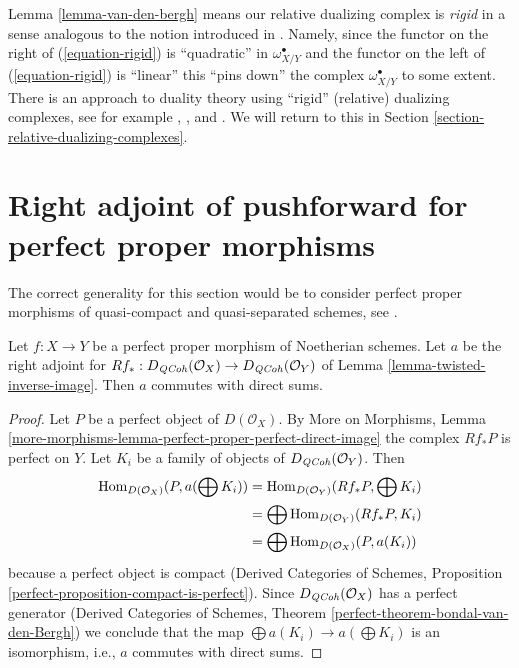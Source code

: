 \begin{remark}
\label{remark-van-den-bergh}
Lemma \ref{lemma-van-den-bergh} means our relative dualizing
complex is {\it rigid} in a sense analogous to the notion introduced
in \cite{vdB-rigid}. Namely, since the functor on the right of
(\ref{equation-rigid})
is ``quadratic'' in $\omega_{X/Y}^\bullet$ and the functor on the left
of (\ref{equation-rigid})
is ``linear'' this ``pins down'' the complex $\omega_{X/Y}^\bullet$
to some extent. There is an approach to duality theory using
``rigid'' (relative) dualizing complexes, see for example
\cite{Neeman-rigid}, \cite{Yekutieli-rigid}, and \cite{Yekutieli-Zhang}.
We will return to this in Section \ref{section-relative-dualizing-complexes}.
\end{remark}





\section{Right adjoint of pushforward for perfect proper morphisms}
\label{section-perfect-proper}

\noindent
The correct generality for this section would be to consider
perfect proper morphisms of quasi-compact and quasi-separated
schemes, see \cite{LN}.

\begin{lemma}
\label{lemma-proper-flat-noetherian}
Let $f : X \to Y$ be a perfect proper morphism of Noetherian schemes.
Let $a$ be the right adjoint for
$Rf_* : D_{\mathit{QCoh}}(\mathcal{O}_X) \to D_{\mathit{QCoh}}(\mathcal{O}_Y)$ of
Lemma \ref{lemma-twisted-inverse-image}. Then $a$ commutes with direct sums.
\end{lemma}

\begin{proof}
Let $P$ be a perfect object of $D(\mathcal{O}_X)$. By
More on Morphisms, Lemma
\ref{more-morphisms-lemma-perfect-proper-perfect-direct-image}
the complex $Rf_*P$ is perfect on $Y$.
Let $K_i$ be a family of objects of $D_{\mathit{QCoh}}(\mathcal{O}_Y)$.
Then
\begin{align*}
\mathop{\mathrm{Hom}}\nolimits_{D(\mathcal{O}_X)}(P, a(\bigoplus K_i))
& =
\mathop{\mathrm{Hom}}\nolimits_{D(\mathcal{O}_Y)}(Rf_*P, \bigoplus K_i) \\
& =
\bigoplus \mathop{\mathrm{Hom}}\nolimits_{D(\mathcal{O}_Y)}(Rf_*P, K_i) \\
& =
\bigoplus \mathop{\mathrm{Hom}}\nolimits_{D(\mathcal{O}_X)}(P, a(K_i))
\end{align*}
because a perfect object is compact (Derived Categories of Schemes,
Proposition \ref{perfect-proposition-compact-is-perfect}).
Since $D_{\mathit{QCoh}}(\mathcal{O}_X)$ has a perfect generator
(Derived Categories of Schemes, Theorem
\ref{perfect-theorem-bondal-van-den-Bergh})
we conclude that the map $\bigoplus a(K_i) \to a(\bigoplus K_i)$
is an isomorphism, i.e., $a$ commutes with direct sums.
\end{proof}

